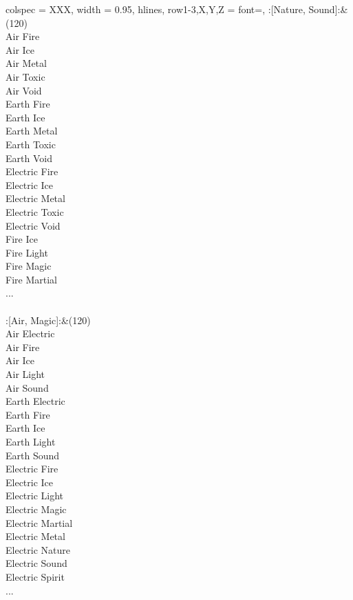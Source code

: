 \begin{longtblr}[
	caption = {2v2 Defending Weak},
	label = {2v2-Defending-Weak},
]{
	colspec = {XXX}, width = 0.95\linewidth,
	hlines,
	row{1-3,X,Y,Z} = {font=\bfseries},
}
	:[Nature, Sound]:&{(120)\\
	Air Fire \\
	Air Ice \\
	Air Metal \\
	Air Toxic \\
	Air Void \\
	Earth Fire \\
	Earth Ice \\
	Earth Metal \\
	Earth Toxic \\
	Earth Void \\
	Electric Fire \\
	Electric Ice \\
	Electric Metal \\
	Electric Toxic \\
	Electric Void \\
	Fire Ice \\
	Fire Light \\
	Fire Magic \\
	Fire Martial \\
	...\\
	}\\

	:[Air, Magic]:&{(120)\\
	Air Electric \\
	Air Fire \\
	Air Ice \\
	Air Light \\
	Air Sound \\
	Earth Electric \\
	Earth Fire \\
	Earth Ice \\
	Earth Light \\
	Earth Sound \\
	Electric Fire \\
	Electric Ice \\
	Electric Light \\
	Electric Magic \\
	Electric Martial \\
	Electric Metal \\
	Electric Nature \\
	Electric Sound \\
	Electric Spirit \\
	...\\
	}\\


\end{longtblr}
